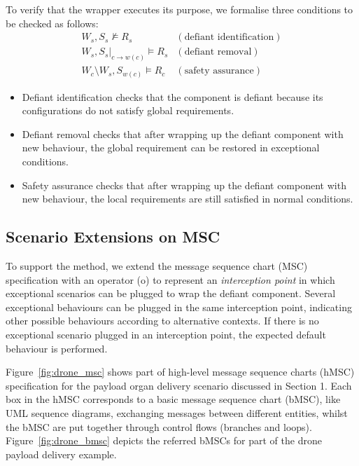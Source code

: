 To verify that the wrapper executes its purpose, we formalise three conditions to be checked as follows:
\[
\begin{array}{ll}
W_s, S_s \not \models R_s & (\mbox{defiant identification})\\
W_s, S_s |_{c\rightarrow w(c)} \models R_s & (\mbox{defiant removal}) \\
W_c \setminus W_s, S_{w(c)} \models R_c & (\mbox{safety assurance})
\end{array}
\]
\begin{itemize}
\item Defiant identification checks that the component is defiant because its configurations do not satisfy global requirements.

\item Defiant removal checks that after wrapping up the defiant component with new behaviour, the global requirement can be restored in exceptional conditions.

\item Safety assurance checks that after wrapping up the defiant component with new behaviour, the local requirements are still satisfied in normal conditions. 
\end{itemize}

\subsection{Scenario Extensions on MSC}
To support the method, we extend the message sequence chart (MSC) specification with an operator (o) to represent an \textit{interception point} in which exceptional scenarios can be plugged to wrap the defiant component. Several exceptional behaviours can be plugged in the same interception point, indicating other possible behaviours according to alternative contexts. If there is no exceptional scenario plugged in an interception point, the expected default behaviour is performed.

Figure~\ref{fig:drone_msc} shows part of high-level message sequence charts (hMSC) specification for the payload organ delivery scenario discussed in Section 1. Each box in the hMSC corresponds to a basic message sequence chart (bMSC), like UML sequence diagrams, exchanging messages between different entities, whilst the bMSC are put together through control flows (branches and loops). Figure~\ref{fig:drone_bmsc} depicts the referred bMSCs for part of the drone payload delivery example.   

